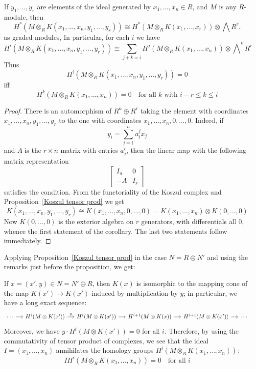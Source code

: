 \begin{corollary}\label{Koszul iso}
If $y_1,\dots,y_r$ are elements of the ideal generated by $x_1,\dots,x_n\in R$, and $M$ is any $R$-module, then
\[H^*(M\otimes_RK(x_1,\dots,x_n,y_1,\dots,y_r))\cong H^*(M\otimes_RK(x_1,\dots,x_r))\otimes\bigwedge R^r.\]
as graded modules, In particular, for each $i$ we have
\[H^i(M\otimes_RK(x_1,\dots,x_n,y_1,\dots,y_r))\cong\sum_{j+k=i}H^j(M\otimes_RK(x_1,\dots,x_n))\otimes \bigwedge\nolimits^kR^r\]
Thus 
\[H^i(M\otimes_RK(x_1,\dots,x_n,y_1,\dots,y_r))=0\]
iff
\[H^k(M\otimes_RK(x_1,\dots,x_n))=0\quad\text{for all $k$ with $i-r\leq k\leq i$}\]
\end{corollary}
\begin{proof}
There is an automorphism of $R^n\oplus R^r$ taking the element with coordinates $x_1,\dots,x_n,y_1,\dots,y_r$ to the one with coordinates $x_1,\dots,x_n,0,\dots,0$. Indeed, if
\[y_i=\sum_{j=1}^{n}a^j_{i}x_j\]
and $A$ is the $r\times n$ matrix with entries $a^i_j$, then the linear map with the following matrix representation
\[
\left[\begin{array}{c|c}
I_n&0\\
-A&I_r
\end{array}\right]\]
satisfies the condition. From the functoriality of the Koszul complex and Proposition~\ref{Koszul tensor prod} we get
\[K(x_1,\dots,x_n,y_1,\dots,y_r)\cong K(x_1,\dots,x_n,0,\dots,0)=K(x_1,\dots,x_n)\otimes K(0,\dots,0)\]
Now $K(0,\dots,0)$ is the exterior algebra on $r$ generators, with differentials all $0$, whence the first statement of the corollary. The last two statements follow immediately.
\end{proof}
Applying Proposition~\ref{Koszul tensor prod} in the case $N=R\oplus N'$ and using the remarks just before the proposition, we get:
\begin{corollary}\label{Koszul tensor corollary}
If $x=(x',y)\in N=N'\oplus R$, then $K(x)$ is isomorphic to the mapping cone of the map $K(x')\to K(x')$ induced by multiplication by $y$; in particular, we have a long exact sequence:
\[\begin{tikzcd}[column sep=small]
\cdots\ar[r]&H^i(M\otimes K(x'))\ar[r,"y"]&H^i(M\otimes K(x'))\ar[r]&H^{i+1}(M\otimes K(x))\ar[r]&H^{i+1}(M\otimes K(x'))\ar[r]&\cdots
\end{tikzcd}\]
Moreover, we have $y\cdot H^i(M\otimes K(x'))=0$ for all $i$. Therefore, by using the commutativity of tensor product of complexes, we see that the ideal $I=(x_1,\dots,x_n)$ annihilates the homology groups $H^i(M\otimes_RK(x_1,\dots,x_n))$:
\[IH^i(M\otimes_RK(x_1,\dots,x_n))=0\quad\text{for all $i$}\]
\end{corollary}
